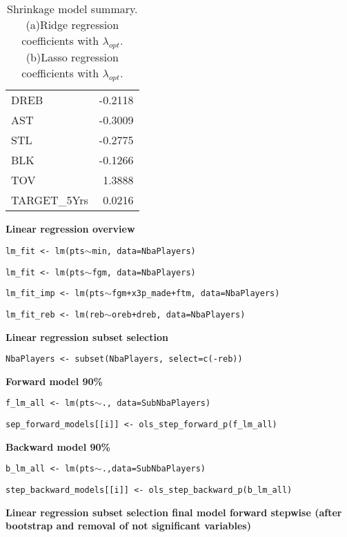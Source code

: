 \begin{table}[H]
\begin{subtable}[h]{0.4\textwidth}
\begin{tabular}{|| l | r ||}
			DREB & -0.2118 \\
			AST & -0.3009 \\
			STL & -0.2775 \\
			BLK & -0.1266 \\
			TOV & 1.3888 \\ 
			TARGET\_5Yrs & 0.0216 \\				
			\hline
		\end{tabular}
		\caption{}
		\label{table:FinalLassoCoef}
	\end{subtable}
	\caption{Shrinkage model summary. (a)Ridge regression coefficients with $\lambda_{opt}$. (b)Lasso regression coefficients with $\lambda_{opt}$.}
	\label{table:RegModSum}
\end{table}

\textbf{Linear regression overview}

\begin{center}
\texttt{lm\_fit <- lm(pts$\sim$min, data=NbaPlayers)}

\texttt{lm\_fit <- lm(pts$\sim$fgm, data=NbaPlayers)}

\texttt{lm\_fit\_imp <- lm(pts$\sim$fgm+x3p\_made+ftm, data=NbaPlayers)}

\texttt{lm\_fit\_reb <- lm(reb$\sim$oreb+dreb, data=NbaPlayers)}
\end{center}
	
\noindent
\textbf{Linear regression subset selection}

\begin{center}
\texttt{NbaPlayers <- subset(NbaPlayers, select=c(-reb))}

\textbf{Forward model 90\%}

\texttt{f\_lm\_all <- lm(pts$\sim$., data=SubNbaPlayers)}

\texttt{sep\_forward\_models[[i]] <- ols\_step\_forward\_p(f\_lm\_all)}

\textbf{Backward model 90\%}

\texttt{b\_lm\_all <- lm(pts$\sim$.,data=SubNbaPlayers)}

\texttt{step\_backward\_models[[i]] <- ols\_step\_backward\_p(b\_lm\_all)}
\end{center}
	
\noindent
\textbf{Linear regression subset selection final model forward stepwise (after bootstrap and removal of not significant variables)}

